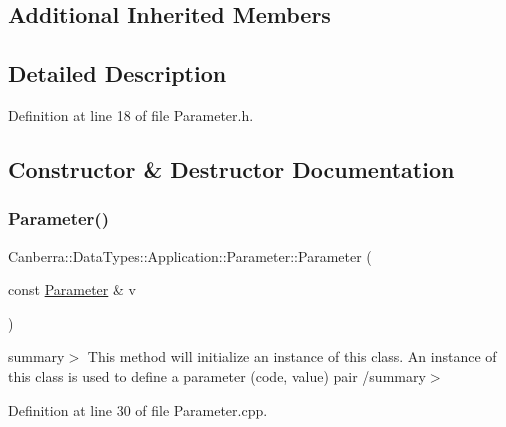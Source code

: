 \subsection*{Additional Inherited Members}


\subsection{Detailed Description}


Definition at line 18 of file Parameter.\+h.



\subsection{Constructor \& Destructor Documentation}
\mbox{\label{class_canberra_1_1_data_types_1_1_application_1_1_parameter_a633d52a56d6b21cd653380900ee85f82_a633d52a56d6b21cd653380900ee85f82}} 
\subsubsection{\texorpdfstring{Parameter()}{Parameter()}\hspace{0.1cm}{\footnotesize\ttfamily [1/2]}}
{\footnotesize\ttfamily Canberra\+::\+Data\+Types\+::\+Application\+::\+Parameter\+::\+Parameter (\begin{DoxyParamCaption}\item[{const \hyperlink{class_canberra_1_1_data_types_1_1_application_1_1_parameter}{Parameter} \&}]{v }\end{DoxyParamCaption})}

summary$>$ This method will initialize an instance of this class. An instance of this class is used to define a parameter (code, value) pair /summary$>$ 

Definition at line 30 of file Parameter.\+cpp.

\mbox{\label{class_canberra_1_1_data_types_1_1_application_1_1_parameter_ab3693e0f7ac1d72f92b644632a4900a8_ab3693e0f7ac1d72f92b644632a4900a8}} 

